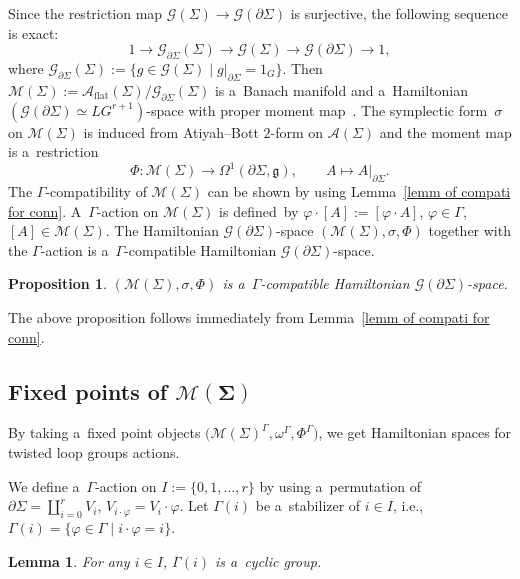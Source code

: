 \documentclass[10pt,a4paper]{amsart}
\numberwithin{equation}{section}
\newtheorem{Lemma}[Theorem]{Lemma}
\newtheorem{Proposition}[Theorem]{Proposition}
\theoremstyle{definition}
\begin{document}
Since the restriction map $\mathcal{G}(\Sigma) \to \mathcal{G}(\partial \Sigma)$ is surjective,
the following sequence is exact:
\[ 1 \to \mathcal{G}_{\partial \Sigma}(\Sigma) \to \mathcal{G}(\Sigma) \to \mathcal{G}(\partial \Sigma) \to 1,
\]
where $\mathcal{G}_{\partial \Sigma}(\Sigma) := \{g \in \mathcal{G}(\Sigma)\mid g|_{\partial \Sigma} =1_G\}$.
Then $\mathcal{M}(\Sigma) := \mathcal{A}_{\mathrm{flat}}(\Sigma) / \mathcal{G}_{\partial \Sigma}(\Sigma)$ is a~Banach manifold and a~Hamiltonian $(\mathcal{G}(\partial \Sigma) \simeq LG^{r+1})$-space with proper moment map~\cite{AMM,Donaldson1992}.
The symplectic form~$\sigma$ on $\mathcal{M}(\Sigma)$ is induced from Atiyah--Bott $2$-form on $\mathcal{A}(\Sigma)$ and the moment map is a~restriction
\[
\Phi \colon \mathcal{M}(\Sigma) \to \Omega^1(\partial \Sigma, \mathfrak{g}),\qquad A \mapsto A|_{\partial \Sigma}.
\]
The $\Gamma$-compatibility of $\mathcal{M}(\Sigma)$ can be shown by using Lemma~\ref{lemm of compati for conn}. A~$\Gamma$-action on $\mathcal{M}(\Sigma)$ is defined~by
$\varphi \cdot [A] := [\varphi \cdot A]$, $ \varphi \in \Gamma$, $ [A] \in \mathcal{M}(\Sigma)$.
The Hamiltonian $\mathcal{G}(\partial \Sigma)$-space $(\mathcal{M}(\Sigma), \sigma, \Phi)$ together with the $\Gamma$-action is a~$\Gamma$-compatible Hamiltonian $\mathcal{G}(\partial \Sigma)$-space.

\begin{Proposition}
 $(\mathcal{M}(\Sigma),\sigma,\Phi)$ is a~$\Gamma$-compatible Hamiltonian $\mathcal{G}(\partial \Sigma)$-space.
\end{Proposition}
The above proposition follows immediately from Lemma~\ref{lemm of compati for conn}.

\subsection[Fixed points of M(Sigma)]{Fixed points of $\boldsymbol{\mathcal{M}(\Sigma)}$}

By taking a~fixed point objects $\bigl(\mathcal{M}(\Sigma)^{\Gamma},\omega^{\Gamma},\Phi^{\Gamma}\bigr)$, we get Hamiltonian spaces for twisted loop groups actions.

We define a~$\Gamma$-action on $I := \{ 0,1,\dots,r\}$ by using a~permutation of $\partial \Sigma = \coprod _{i=0}^{r} V_i$,
$V_{i \cdot \varphi } = V_{i} \cdot \varphi$.
Let $\Gamma(i) $ be a~stabilizer of $i \in I$, i.e., $\Gamma(i) = \{\varphi \in \Gamma\mid i \cdot \varphi = i\}$.

\begin{Lemma}
 For any $i \in I$, $\Gamma(i)$ is a~cyclic group.
\end{Lemma}
\end{document}

